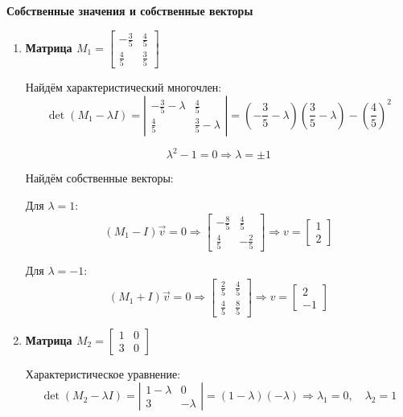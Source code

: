 \textbf{Собственные значения и собственные векторы}

\begin{enumerate}
  \item \textbf{Матрица $M_1 = 
  \begin{bmatrix}
    -\frac{3}{5} & \frac{4}{5} \\
    \frac{4}{5} & \frac{3}{5}
  \end{bmatrix}$}

  Найдём характеристический многочлен:
  \[
    \det(M_1 - \lambda I) = 
    \left| \begin{matrix}
      -\frac{3}{5} - \lambda & \frac{4}{5} \\
      \frac{4}{5} & \frac{3}{5} - \lambda
    \end{matrix} \right| =
    \left( -\frac{3}{5} - \lambda \right)\left( \frac{3}{5} - \lambda \right) - \left( \frac{4}{5} \right)^2
  \]

  \[
    \lambda^2 - 1 = 0 \Rightarrow \lambda = \pm 1
  \]

  Найдём собственные векторы:

  Для $\lambda = 1$:
  \[
    (M_1 - I)\vec{v} = 0 \Rightarrow 
    \begin{bmatrix}
      -\frac{8}{5} & \frac{4}{5} \\
      \frac{4}{5} & -\frac{2}{5}
    \end{bmatrix}
    \Rightarrow v = 
    \begin{bmatrix}
      1 \\
      2
    \end{bmatrix}
  \]

  Для $\lambda = -1$:
  \[
    (M_1 + I)\vec{v} = 0 \Rightarrow 
    \begin{bmatrix}
      \frac{2}{5} & \frac{4}{5} \\
      \frac{4}{5} & \frac{8}{5}
    \end{bmatrix}
    \Rightarrow v = 
    \begin{bmatrix}
      2 \\
      -1
    \end{bmatrix}
  \]

  \item \textbf{Матрица $M_2 = 
  \begin{bmatrix}
    1 & 0 \\
    3 & 0
  \end{bmatrix}$}

  Характеристическое уравнение:
  \[
    \det(M_2 - \lambda I) = 
    \left| \begin{matrix}
      1 - \lambda & 0 \\
      3 & -\lambda
    \end{matrix} \right| = (1 - \lambda)(-\lambda)
    \Rightarrow \lambda_1 = 0, \quad \lambda_2 = 1
  \]


\end{enumerate}
